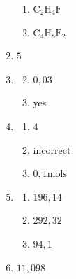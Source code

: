 \begin{multicols}{4}
\begin{enumerate}[noitemsep, label=\textbf{(\arabic*)} ]
\begin{enumerate}[noitemsep, label=\textbf{(\alph*)} ]
 \item $\text{C}_{2}\text{H}_{4}\text{F}$
\item $\text{C}_{4}\text{H}_{8}\text{F}_{2}$
\end{enumerate}
\item $5$
\item
\begin{enumerate}[noitemsep, label=\textbf{(\alph*)} ]
\setcounter{enumi}{1}
\item $0,03$
\item yes
\end{enumerate}
\item
\begin{enumerate}[noitemsep, label=\textbf{(\alph*)} ]
 \item $4$
\item incorrect
\item $0,1 \text{mols}$
\end{enumerate}
\item
\begin{enumerate}[noitemsep, label=\textbf{(\alph*)} ]
 \item $196,14$
\item $292,32$
\item $94,1$
\end{enumerate}
\item $11,098$
 \end{enumerate}
\end{multicols}

